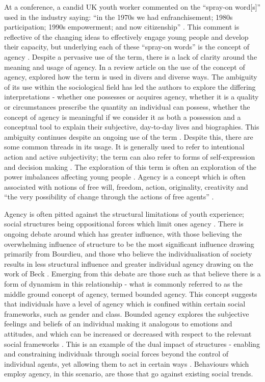 At a conference, a candid UK youth worker commented on the “spray-on word[s]” used in the industry saying: “in the 1970s we had enfranchisement; 1980s participation; 1990s empowerment; and now citizenship” \citep[][p1]{Jeffs2005}. This comment is reflective of the changing ideas to effectively engage young people and develop their capacity, but underlying each of these “spray-on words” is the concept of agency \citep{Sercombe2010}. Despite a pervasive use of the term, there is a lack of clarity around the meaning and usage of agency. In a review article on the use of the concept of agency, \citet{Coffey2014} explored how the term is used in divers and diverse ways. The ambiguity of its use within the sociological field has led the authors to explore the differing interpretations - whether one possesses or acquires agency, whether it is a quality or circumstances prescribe the quantity an individual can possess, whether the concept of agency is meaningful if we consider it as both a possession and a conceptual tool to explain their subjective, day-to-day lives and biographies. This ambiguity continues despite an ongoing use of the term \citep{Coffey2014}. Despite this, there are some common threads in its usage. It is generally used to refer to intentional action and active subjectivity; the term can also refer to forms of self-expression and decision making \citep{Coffey2014}. The exploration of this term is often an exploration of the power imbalances affecting young people \citep{Coffey2014}. Agency is a concept which is often associated with notions of free will, freedom, action, originality, creativity and “the very possibility of change through the actions of free agents” \cite[][p240]{Barker2005}. 

Agency is often pitted against the structural limitations of youth experience; social structures being oppositional forces which limit ones agency \citep{Coffey2014}. There is ongoing debate around which has greater influence, with those believing the overwhelming influence of structure to be the most significant influence drawing primarily from Bourdieu, and those who believe the individualisation of society results in less structural influence and greater individual agency drawing on the work of Beck \citep{Coffey2014}. Emerging from this debate are those such as \citet{Evans2002a} that believe there is a form of dynamism in this relationship - what is commonly referred to as the middle ground concept of agency, termed bounded agency. This concept suggests that individuals have a level of agency which is confined within certain social frameworks, such as gender and class. Bounded agency explores the subjective feelings and beliefs of an individual making it analogous to emotions and attitudes, and which can be increased or decreased with respect to the relevant social frameworks \citep{Evans2002a}. This is an example of the dual impact of structures - enabling and constraining individuals through social forces beyond the control of individual agents, yet allowing them to act in certain ways \citep{Barker2005}. Behaviours which employ agency, in this scenario, are those that go against existing social trends. 



